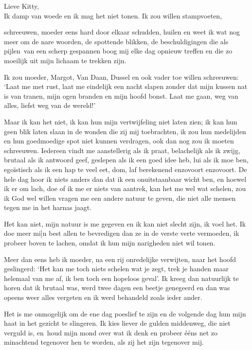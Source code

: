 \documentclass{book}
\begin{document}
Lieve Kitty,\\Ik damp van woede en ik mag het niet tonen. Ik zou willen
stampvoeten,

schreeuwen, moeder eens hard door elkaar schudden, huilen en weet ik wat
nog meer om de nare woorden, de spottende blikken, de beschuldigingen
die als pijlen~van een scherp gespannen boog mij elke dag opnieuw
treffen en die zo moeilijk uit mijn lichaam te trekken zijn.

Ik zou moeder, Margot, Van Daan, Dussel en ook vader toe willen
schreeuwen: `Laat me met rust, laat me eindelijk een nacht slapen zonder
dat mijn kussen nat is van tranen, mijn ogen branden en mijn hoofd
bonst. Laat me gaan, weg van alles, liefst weg van de wereld!'

Maar ik kan het niet, ik kan hun mijn vertwijfeling niet laten zien; ik
kan hun geen blik laten slaan in de wonden die zij mij toebrachten, ik
zou hun medelijden en hun goedmoedige spot niet kunnen verdragen, ook
dan nog zou ik moeten schreeuwen. Iedereen vindt me aanstellerig als ik
praat, belachelijk als ik zwijg, brutaal als ik antwoord geef, geslepen
als ik een goed idee heb, lui als ik moe ben, egoïstisch als ik een hap
te veel eet, dom, laf berekenend enzovoort enzovoort. De hele dag hoor
ik niets anders dan dat ik een onuitstaanbaar wicht ben, en hoewel ik er
om lach, doe of ik me er niets van aantrek, kan het me wel wat schelen,
zou ik God wel willen vragen me een andere natuur te geven, die niet
alle mensen tegen me in het harnas jaagt.

Het kan niet, mijn natuur is me gegeven en ik kan niet slecht zijn, ik
voel het. Ik doe meer mi{]}n best allen te bevredigen dan ze in de
verste verte vermoeden, ik probeer boven te lachen, omdat ik hun mijn
narigheden niet wil tonen.

Meer dan eens heb ik moeder, na een rij onredelijke verwijten, naar het
hoofd geslingerd: `Het kan me toch niets schelen wat je zegt, trek je
handen maar helemaal van me af, ik ben toch een hopeloos geval'. Ik
kreeg dan natuurlijk te horen dat ik brutaal was, werd twee dagen een
beetje genegeerd en dan was opeens weer alles vergeten en ik werd
behandeld zoals ieder ander.

Het is me onmogelijk om de ene dag poeslief te zijn en de volgende dag
hun mijn haat in het gezicht te slingeren. Ik kies liever de gulden
middenweg, die niet verguld is, en~houd mijn mond over wat ik denk en
probeer ééns net zo minachtend tegenover hen te worden, als zij het zijn
tegenover mij.
\end{document}
